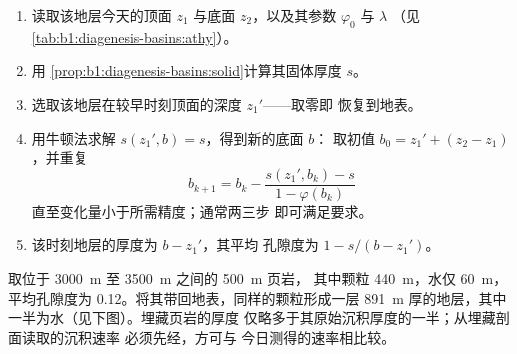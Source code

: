 \begin{method}[地层的去压实]\label{met:b1:diagenesis-basins:decompaction}
\begin{enumerate}
  \item 读取该地层今天的顶面 $z_1$ 与底面 $z_2$，以及其参数
        $\varphi_0$ 与 $\lambda$
        （见\cref{tab:b1:diagenesis-basins:athy}）。
  \item 用
        \cref{prop:b1:diagenesis-basins:solid}计算其固体厚度 $s$。
  \item 选取该地层在较早时刻顶面的深度 $z_1'$——取零即
        恢复到地表。
  \item 用牛顿法求解 $s(z_1', b) = s$，得到新的底面 $b$：
        取初值 $b_0 = z_1' + (z_2 - z_1)$，并重复
        \[
          b_{k+1} = b_k - \frac{s(z_1', b_k) - s}{1 - \varphi(b_k)}
        \]
        直至变化量小于所需精度；通常两三步
        即可满足要求。
  \item 该时刻地层的厚度为 $b - z_1'$，其平均
        孔隙度为 $1 - s/(b - z_1')$。
\end{enumerate}
\end{method}

取位于 \qty{3000}{m} 至 \qty{3500}{m} 之间的 \qty{500}{m} 页岩，
其中颗粒 \qty{440}{m}，水仅 \qty{60}{m}，平均孔隙度为
\num{0.12}。将其带回地表，同样的颗粒形成一层
\qty{891}{m} 厚的地层，其中一半为水（见下图）。埋藏页岩的厚度
仅略多于其原始沉积厚度的一半；从埋藏剖面读取的沉积速率
必须先经，方可与
今日测得的速率相比较。

